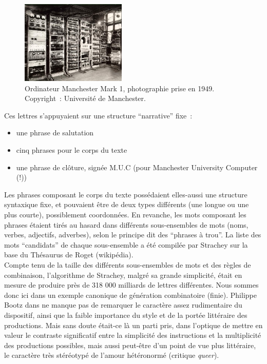 \documentclass{article}
\begin{document}
				\begin{figure}
					\centering
					\includegraphics[width=5cm]{manchester_mark_1.jpg}
					\caption{Ordinateur Manchester Mark 1, photographie prise en 1949. Copyright~: Université de Manchester.}
					\label{fig:manchester_mark_1}
				\end{figure}
				
				Ces lettres s'appuyaient sur une structure ``narrative'' fixe~:
				\begin{itemize}
					\item une phrase de salutation
					\item cinq phrases pour le corps du texte
					\item une phrase de clôture, signée M.U.C (pour Manchester University Computer (!))
				\end{itemize}
				Les phrases composant le corps du texte possédaient elles-aussi une structure syntaxique fixe, et pouvaient être de deux types différents (une longue ou une plus courte), possiblement coordonnées. En revanche, les mots composant les phrases étaient tirés au hasard dans différents sous-ensembles de mots (noms, verbes, adjectifs, adverbes), selon le principe dit des ``phrases à trou''.  La liste des mots ``candidats'' de chaque sous-ensemble a été compilée par Strachey sur la base du Thésaurus de Roget (wikipédia).\\
				
				Compte tenu de la taille des différents sous-ensembles de mots et des règles de combinaison, l'algorithme de Strachey, malgré sa grande simplicité, était en mesure  de produire près de 318 000 milliards de lettres différentes.  Nous sommes donc ici dans un exemple canonique de génération combinatoire (finie). Philippe Bootz dans \cite{bootz} ne manque pas de remarquer le caractère assez rudimentaire du dispositif, ainsi que la faible importance du style et de la portée littéraire des productions. Mais sans doute était-ce là un parti pris, dans l'optique de mettre en valeur le contraste significatif entre la simplicité des instructions et la multiplicité des productions possibles, mais aussi  peut-être d'un point de vue plus littéraire, le caractère très stéréotypé de l'amour hétéronormé (critique \textit{queer}).\\
				
\end{document}

